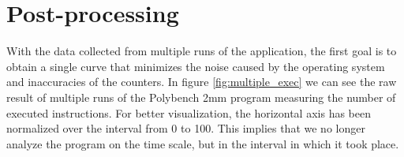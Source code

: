 
\section{Post-processing} \label{sec:posprocessing}

With the data collected from multiple runs of the application, the first goal is to obtain a single curve that minimizes the noise caused by the operating system and inaccuracies of the counters. 
In figure \ref{fig:multiple_exec} we can see the raw result of multiple runs of the Polybench 2mm program measuring the number of executed instructions. 
For better visualization, the horizontal axis has been normalized over the interval from 0 to 100. 
This implies that we no longer analyze the program on the time scale, but in the interval in which it took place.

